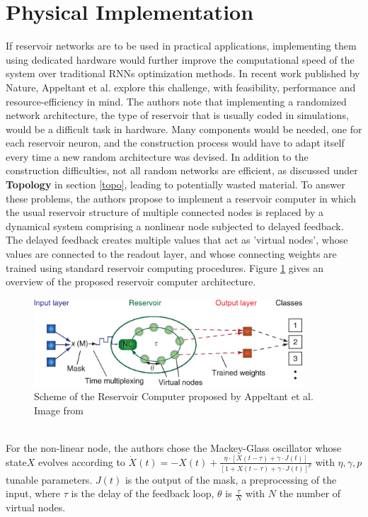 \documentclass[12pt,oneside]{CUNY_CS_PhD}
\begin{document}
\section{Physical Implementation}
If reservoir networks are to be used in practical applications, implementing them using dedicated hardware would further improve the computational speed of the system over traditional RNNs optimization methods. In recent work published by Nature, Appeltant et al. \cite{appeltant2011information, appeltant2014constructing} 
explore this challenge, with feasibility, performance and resource-efficiency in mind. The authors note that implementing a randomized network architecture, the type of reservoir that is usually coded in simulations, would be a difficult task in hardware. Many components would be needed, one for each reservoir neuron, and the construction process would have to adapt itself every time a new random architecture was devised. In addition to the construction difficulties, not all random networks are efficient, as discussed under \textbf{Topology} in section \ref{topo}, leading to potentially wasted material. To answer these problems, the authors propose to implement a reservoir computer in which the usual reservoir structure of multiple connected nodes is replaced by a dynamical system comprising a nonlinear node subjected to delayed feedback. The delayed feedback creates multiple values that act as 'virtual nodes', whose values are connected to the readout layer, and whose connecting weights are trained using standard reservoir computing procedures. Figure \ref{fig:delayed_fb} gives an overview of the proposed reservoir computer architecture.
\begin{figure}[!htbp]
\centering
\includegraphics[width=0.9\textwidth]{pictures/delayed-feedback-res.png}
\caption{Scheme of the Reservoir Computer proposed by Appeltant et al. Image from \cite{appeltant2011information}}
\label{fig:delayed_fb}
\end{figure}\\
For the non-linear node, the authors chose the Mackey-Glass oscillator whose state$X$ evolves according to $\dot X (t) = -X(t) + \frac{\eta \cdot [X(t-\tau) + \gamma \cdot J(t)]}{[1+X(t-\tau) + \gamma \cdot J(t)]^p }$ with $\eta, \gamma, p$ tunable parameters. $J(t)$ is the output of the mask, a preprocessing of the input, where $\tau$ is the delay of the feedback loop, $\theta$ is $\frac{\tau}{N}$ with $N$ the number of virtual nodes. 
\end{document}
